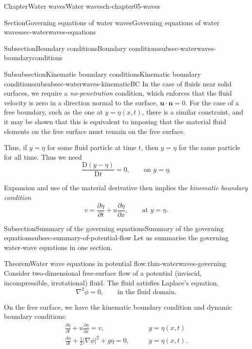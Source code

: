 \documentclass[oneside,10pt,]{book}
\numberwithin{equation}{section}
\newcommand{\DD}[2]{\frac{\mathrm{D}#1}{\mathrm{D}#2}}
\newcommand{\pd}[2]{\frac{\partial#1}{\partial#2}}
\newcommand{\bn}{\boldsymbol{n}}
\newcommand{\bu}{\boldsymbol{u}}
\begin{document}
\begin{chapterptx}{Chapter}{Water waves}{}{Water waves}{}{}{ch-chapter05-waves}
\begin{sectionptx}{Section}{Governing equations of water waves}{}{Governing equations of water waves}{}{}{sec-waterwaves-equations}
\begin{subsectionptx}{Subsection}{Boundary conditions}{}{Boundary conditions}{}{}{subsec-waterwaves-boundaryconditions}
\begin{subsubsectionptx}{Subsubsection}{Kinematic boundary conditions}{}{Kinematic boundary conditions}{}{}{subsubsec-waterwaves-kinematicBC}
In the case of fluids near solid surfaces, we require a \emph{no-penetration} condition, which enforces that the fluid velocity is zero in a direction normal to the surface, \(\bu \cdot \bn = 0\). For the case of a free boundary, such as the one at \(y = \eta(x, t)\), there is a similar constraint, and it may be shown that this is equivalent to imposing that the material fluid elements on the free surface must remain on the free surface.%
\par
Thus, if \(y = \eta\) for some fluid particle at time \(t\), then \(y = \eta\) for the same particle for all time. Thus we need%
\begin{equation*}
\DD{(y - \eta)}{t} = 0, \qquad \text{on $y = \eta$}.
\end{equation*}
%
\par
Expansion and use of the material derivative then implies the \emph{kinematic boundary condition}%
\begin{equation}
v = \pd{\eta}{t} + u \pd{\eta}{x}, \qquad \text{at $y = \eta$}.\label{eqn-waterwaves-kinematicBC}
\end{equation}
%
\end{subsubsectionptx}
\end{subsectionptx}
%
%
\typeout{************************************************}
\typeout{************************************************}
%
\begin{subsectionptx}{Subsection}{Summary of the governing equations}{}{Summary of the governing equations}{}{}{subsec-summary-of-potential-flow}
Let us summarise the governing water-wave equations in one section.%
\begin{theorem}{Theorem}{Water wave equations in potential flow.}{}{thm-waterwaves-governing}%
Consider two-dimensional free-surface flow of a potential (inviscid, incompressible, irrotational) fluid. The fluid satisfies Laplace's equation,%
\begin{equation*}
\nabla^2 \phi = 0, \qquad \text{in the fluid domain}.
\end{equation*}
%
\par
On the free surface, we have the kinematic boundary condition and dynamic boundary conditions:%
\begin{align}
\pd{\eta}{t} + u \pd{\eta}{x} = v, \qquad & y = \eta(x, t)\label{wwfull02}\\
\pd{\phi}{t} + \frac{1}{2}|\nabla \phi|^2 + g\eta = 0, \qquad & y = \eta(x, t).\label{wwfull03}
\end{align}

\end{theorem}
\end{subsectionptx}
\end{sectionptx}
\end{chapterptx}
\end{document}
